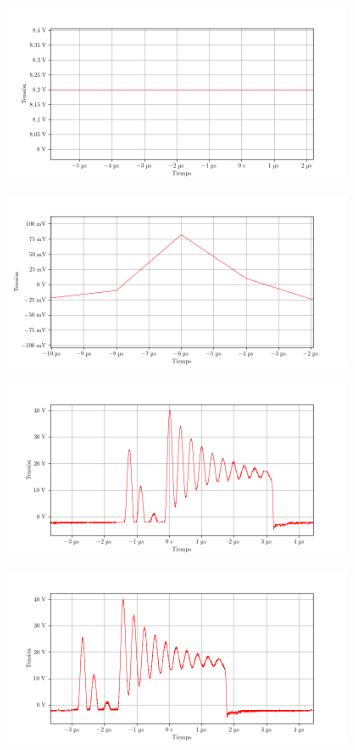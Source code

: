 \begin{figure}[ht]
    \centering
    \includegraphics[width=0.8\textwidth]{images/capturas-osciloscopio/17-11-2022/45.png}
    \caption{}
    \label{fig:osc:45}
\end{figure}

\begin{figure}[ht]
    \centering
    \includegraphics[width=0.8\textwidth]{images/capturas-osciloscopio/17-11-2022/46.png}
    \caption{}
    \label{fig:osc:46}
\end{figure}

\begin{figure}[ht]
    \centering
    \includegraphics[width=0.8\textwidth]{images/capturas-osciloscopio/17-11-2022/47.png}
    \caption{}
    \label{fig:osc:47}
\end{figure}

\begin{figure}[ht]
    \centering
    \includegraphics[width=0.8\textwidth]{images/capturas-osciloscopio/17-11-2022/48.png}
    \caption{}
    \label{fig:osc:48}
\end{figure}

